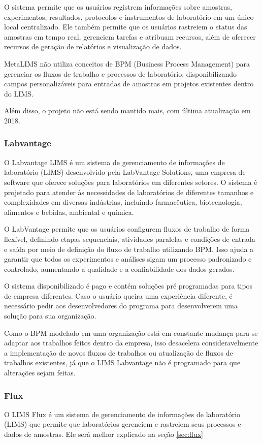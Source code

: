 O sistema permite que os usuários registrem informações sobre amostras, experimentos, resultados, protocolos e instrumentos de laboratório em um único local centralizado. Ele também permite que os usuários rastreiem o status das amostras em tempo real, gerenciem tarefas e atribuam recursos, além de oferecer recursos de geração de relatórios e visualização de dados.

MetaLIMS não utiliza conceitos de BPM (Business Process Management) para gerenciar os fluxos de trabalho e processos de laboratório, disponibilizando campos personalizáveis para entradas de amostras em projetos existentes dentro do LIMS.

Além disso, o projeto não está sendo mantido mais, com última atualização em 2018.

\subsubsection{Labvantage}

O Labvantage LIMS é um sistema de gerenciamento de informações de laboratório (LIMS) desenvolvido pela LabVantage Solutions, uma empresa de software que oferece soluções para laboratórios em diferentes setores. O sistema é projetado para atender às necessidades de laboratórios de diferentes tamanhos e complexidades em diversas indústrias, incluindo farmacêutica, biotecnologia, alimentos e bebidas, ambiental e química.

O LabVantage permite que os usuários configurem fluxos de trabalho de forma flexível, definindo etapas sequenciais, atividades paralelas e condições de entrada e saída por meio de definição do fluxo de trabalho utilizando BPM. Isso ajuda a garantir que todos os experimentos e análises sigam um processo padronizado e controlado, aumentando a qualidade e a confiabilidade dos dados gerados.

O sistema disponibilizado é pago e contém soluções pré programadas para tipos de empresa diferentes. Caso o usuário queira uma experiência diferente, é necessário pedir aos desenvolvedores do programa para desenvolverem uma solução para sua organização.

Como o BPM modelado em uma organização está em constante mudança para se adaptar aos trabalhos feitos dentro da empresa, isso desacelera consideravelmente a implementação de novos fluxos de trabalhos ou atualização de fluxos de trabalhos existentes, já que o LIMS Labvantage não é programado para que alterações sejam feitas.

\subsubsection{Flux}

O LIMS Flux é um sistema de gerenciamento de informações de laboratório (LIMS) que permite que laboratórios gerenciem e rastreiem seus processos e dados de amostras. Ele será melhor explicado na seção \ref{sec:flux}



